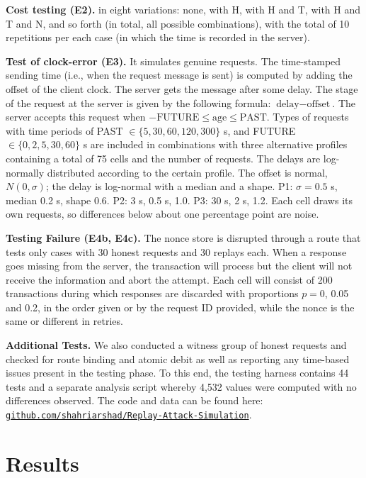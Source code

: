 \documentclass[conference]{IEEEtran}
\begin{document}
\textbf{Cost testing (E2).} in eight variations: none, with H, with H and T, with H and T and N, and so forth (in total, all possible combinations), with the total of 10 repetitions per each case (in which the time is recorded in the server).

\textbf{Test of clock-error (E3).} 
It simulates genuine requests. The time-stamped sending time (i.e., when the request message is sent) is computed by adding the offset of the client clock. The server gets the message after some delay. The stage of the request at the server is given by the following formula: $\text{delay} - \text{offset}$. The server accepts this request when $-\mathrm{FUTURE} \le \text{age} \le \mathrm{PAST}$. Types of requests with time periods of PAST $\in\{5,30,60,120,300\}$ s, and FUTURE $\in\{0,2,5,30,60\}$ s are included in combinations with three alternative profiles containing a total of 75 cells and the number of requests. The delays are log-normally distributed according to the certain profile. The offset is normal, $N(0,\sigma)$; the delay is log-normal with a median and a shape. P1: $\sigma=0.5$ s, median 0.2 s, shape 0.6. P2: 3 s, 0.5 s, 1.0. P3: 30 s, 2 s, 1.2. Each cell draws its own requests, so differences below about one percentage point are noise.

\textbf{Testing Failure (E4b, E4c).} The nonce store is disrupted through a route that tests only cases with 30 honest requests and 30 replays each. When a response goes missing from the server, the transaction will process but the client will not receive the information and abort the attempt. Each cell will consist of 200 transactions during which responses are discarded with proportions $p=0$, 0.05 and 0.2, in the order given or by the request ID provided, while the nonce is the same or different in retries. 

\textbf{Additional Tests.} We also conducted a witness group of honest requests and checked for route binding and atomic debit as well as reporting any time-based issues present in the testing phase. To this end, the testing harness contains 44 tests and a separate analysis script whereby 4,532 values were computed with no differences observed. The code and data can be found here: \href{https://github.com/shahriarshad/Replay-Attack-Simulation}{\texttt{github.com/\allowbreak shahriarshad/\allowbreak Replay-Attack-Simulation}}.

\section{Results}\label{sec:results}
\end{document}
